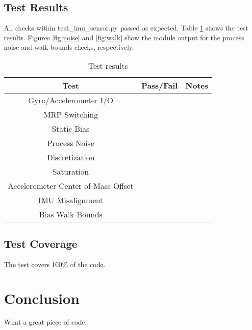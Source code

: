 \documentclass[]{BasiliskReportMemo}
\begin{document}
\subsection{Test Results}

All checks within test\_imu\_sensor.py passed as expected. Table \ref{tab:results} shows the test results. Figures \ref{fig:noise} and \ref{fig:walk} show the module output for the process noise and walk bounds checks, respectively.

\begin{table}[H]
	\caption{Test results}
	\label{tab:results}
	\centering \fontsize{10}{10}\selectfont
	\begin{tabular}{c | c | c  } %
		\hline
		\textbf{Test} 						  			   & \textbf{Pass/Fail} 						   			& \textbf{Notes} 									\\ \hline
		Gyro/Accelerometer I/O 		   				&               & 			 \\ \hline
		MRP Switching 					   				&  	   &   \\ \hline
		Static Bias 										 &  				 &  				   \\ \hline
		Process Noise 							         &  				& 				 \\ \hline
		Discretization 						  			   &     &   \\ \hline
		Saturation 							   				&   		 &        \\ \hline
		Accelerometer Center of Mass Offset &     &   \\ \hline
		IMU Misalignment 							   &      &   \\ \hline
		Bias Walk Bounds 							   &    & \\ \hline
	\end{tabular}
\end{table}


 \label{fig:noise}
 \label{fig:walk}

\pagebreak %





\subsection{Test Coverage}
The test covers 100\% of the code.

\section{Conclusion}
What a great piece of code.
\end{document}
